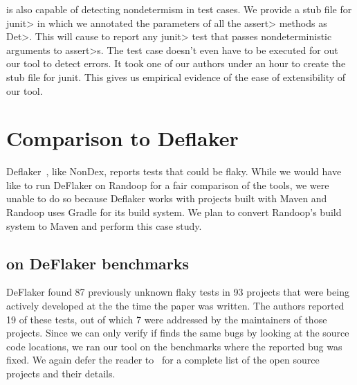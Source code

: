 \TheDeterminismChecker is also capable of detecting nondetermism in test cases. We provide a stub file
for \<junit> in which we annotated the parameters of all the \<assert> methods as \<Det>.
This will cause \TheDeterminismChecker to report any \<junit> test that passes nondeterministic arguments to 
\<assert>s. The test case doesn't even have to be executed for out our tool to detect errors.
It took one of our authors under an hour to create the stub file for junit. This gives us
empirical evidence of the ease of extensibility of our tool.


\section{Comparison to Deflaker}
Deflaker~\cite{deflaker}, like NonDex, reports tests that could be flaky. 
While we would have like to run DeFlaker on Randoop for a fair comparison of the tools,
we were unable to do so because Deflaker works with projects built with Maven and Randoop
uses Gradle for its build system. We plan to convert Randoop's build system to Maven and
perform this case study.

\subsection{\TheDeterminismChecker on DeFlaker benchmarks}\label{sec:deflaker-benchmarks}
DeFlaker found 87 previously unknown flaky tests in 93 projects that were being actively developed at the the time
the paper was written. The authors reported 19 of these tests, out of which 7 were addressed by the maintainers of
those projects. Since we can only verify if \TheDeterminismChecker finds the same bugs by looking at the source code
locations, we ran our tool on the benchmarks where the reported bug was fixed. We again defer the reader to~\cite{deflaker}
for a complete list of the open source projects and their details.

